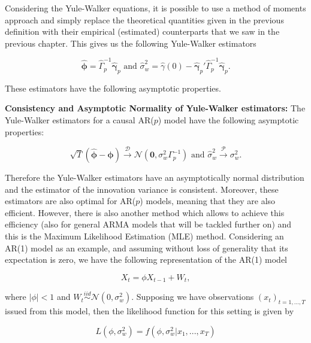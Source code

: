 \documentclass[]{book}
\theoremstyle{definition}
\theoremstyle{definition}
\theoremstyle{definition}
\theoremstyle{remark}
\begin{document}
Considering the Yule-Walker equations, it is possible to use a method of
moments approach and simply replace the theoretical quantities given in
the previous definition with their empirical (estimated) counterparts
that we saw in the previous chapter. This gives us the following
Yule-Walker estimators

\begin{equation}
    \hat{\mathbf{\phi}} = \hat{\Gamma}_p^{-1}\hat{\mathbf{\gamma}}_p \,\, \text{and} \,\, \hat{\sigma}_w^2 = \hat{\gamma}(0) - \hat{\mathbf{\gamma}}_p'\hat{\Gamma}_p^{-1}\hat{\mathbf{\gamma}}_p .
\end{equation}

These estimators have the following asymptotic properties.

\textbf{Consistency and Asymptotic Normality of Yule-Walker estimators:}
The Yule-Walker estimators for a causal AR(\(p\)) model have the
following asymptotic properties:

\begin{equation*}
\sqrt{T}(\hat{\mathbf{\phi}}- \mathbf{\phi}) \xrightarrow{\mathcal{D}} \mathcal{N}(\mathbf{0},\sigma_w^2\Gamma_p^{-1}) \,\, \text{and} \,\, \hat{\sigma}_w^2 \xrightarrow{\mathcal{P}} \sigma_w^2 .
\end{equation*}

Therefore the Yule-Walker estimators have an asymptotically normal
distribution and the estimator of the innovation variance is consistent.
Moreover, these estimators are also optimal for AR(\(p\)) models,
meaning that they are also efficient. However, there is also another
method which allows to achieve this efficiency (also for general ARMA
models that will be tackled further on) and this is the Maximum
Likelihood Estimation (MLE) method. Considering an AR(1) model as an
example, and assuming without loss of generality that its expectation is
zero, we have the following representation of the AR(1) model

\begin{equation*}
X_t = \phi X_{t-1} + W_t,
\end{equation*}

where \(|\phi|<1\) and
\(W_t \overset{iid}{\sim} \mathcal{N}(0,\sigma_w^2)\). Supposing we have
observations \((x_t)_{t=1,...,T}\) issued from this model, then the
likelihood function for this setting is given by

\begin{equation*}
L(\phi,\sigma_w^2) = f(\phi,\sigma_w^2|x_1,...,x_T)
\end{equation*}
\end{document}
